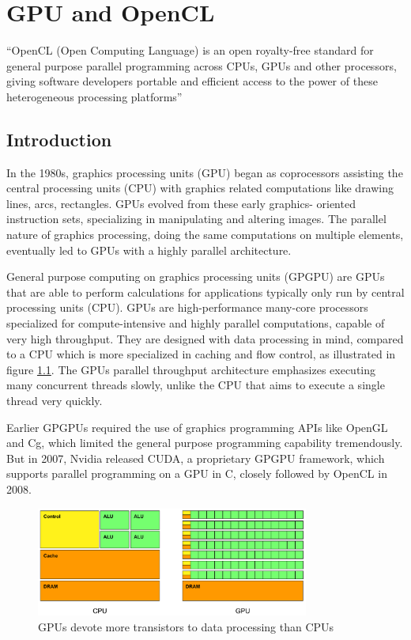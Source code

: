 
\chapter{GPU and OpenCL}
\label{chap:arch}
``OpenCL (Open Computing Language) is an open royalty-free standard
for general purpose parallel programming across CPUs, GPUs and other
processors, giving software developers portable and efficient access
to the power of these heterogeneous processing platforms''
\cite{cl-spec}

\section{Introduction}

In the 1980s, graphics processing units (GPU) began as coprocessors assisting
the central processing units (CPU) with graphics related computations like
drawing lines, arcs, rectangles. GPUs evolved from these early graphics-
oriented instruction sets, specializing in manipulating and altering images.
The parallel nature of graphics processing, doing the same computations on
multiple elements, eventually led to GPUs with a highly parallel architecture.

General purpose computing on graphics processing units (GPGPU) are GPUs that
are able to perform calculations for applications typically only run by
central processing units (CPU). GPUs are high-performance many-core processors
specialized for compute-intensive and highly parallel computations, capable of
very high throughput. They are designed with data processing in mind, compared
to a CPU which is more specialized in caching and flow control, as illustrated
in figure \ref{fig:cpu-vs-gpu}. The GPUs parallel throughput architecture
emphasizes executing many concurrent threads slowly, unlike the CPU that aims
to execute a single thread very quickly.

Earlier GPGPUs required the use of graphics programming APIs like OpenGL and
Cg, which limited the general purpose programming capability tremendously. But
in 2007, Nvidia released CUDA, a proprietary GPGPU framework, which supports
parallel programming on a GPU in C, closely followed by OpenCL in 2008.

\begin{figure}
  \includegraphics[width=0.8\textwidth]{images/cpu-vs-gpu.pdf}
  \caption{GPUs devote more transistors to data processing than CPUs}
  \label{fig:cpu-vs-gpu}
\end{figure}


